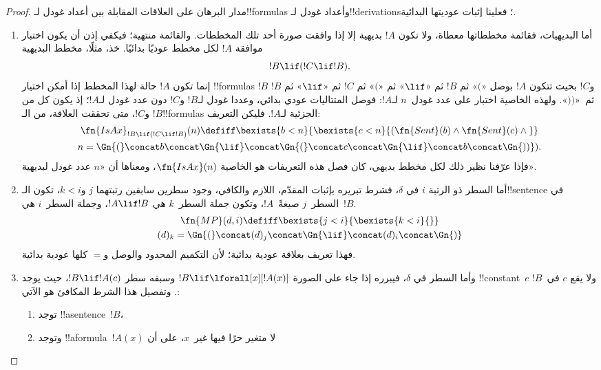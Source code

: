 \documentclass[../../../include/open-logic-section]{subfiles}
\begin{document}
\begin{proof}
مدار البرهان على العلاقات المقابلة بين أعداد غودل لـ!!{formula}s
وأعداد غودل لـ!!{derivation}s؛ فعلينا إثبات عوديتها البدائية.
\begin{enumerate}
\item أما البديهيات، فقائمة مخططاتها معطاة، ولا تكون $!A$ بديهية إلا
  إذا وافقت صورة أحد تلك المخططات. والقائمة منتهية؛ فيكفي إذن أن يكون
  اختبار موافقة $!A$ لكل مخطط عوديًا بدائيًا. خذ، مثلًا، مخطط البديهية
  \[
  !B \lif (!C \lif !B).
  \]
  إنما تكون $!A$ حالة لهذا المخطط إذا أمكن اختيار !!{formula}s $!B$
  و$!C$ بحيث تتكون $!A$ بوصل «$($» ثم $!B$ ثم «$\lif$» ثم «$($»
  ثم $!C$ ثم «$\lif$» ثم $!B$ ثم~«$))$». ولهذه الخاصية اختبار على
  عدد غودل~$n$ لـ$!A$: فوصل المتتاليات عودي بدائي، وعددا غودل
  لـ$!B$ و$!C$ دون عدد غودل لـ$!A$؛ إذ يكون كل من $!B$ و$!C$،
  متى تحققت العلاقة، من الـ!!{formula}s الجزئية لـ$!A$.
  فليكن التعريف:
  \begin{multline*}
  \fn{IsAx}_{!B \lif (!C \lif !B)}(n) \defiff \bexists{b< n}{
    \bexists{c < n}{(\fn{Sent}(b) \land \fn{Sent}(c) \land {}}}\\ n =
  \Gn{(} \concat b \concat \Gn{\lif} \concat \Gn{(} \concat c \concat
  \Gn{\lif} \concat b \concat \Gn{))}).
  \end{multline*}
  فإذا عرّفنا نظير ذلك لكل مخطط بديهي، كان فصل هذه التعريفات هو
  الخاصية $\fn{IsAx}(n)$، ومعناها أن «$n$ عدد غودل لبديهية».
\item أما السطر ذو الرتبة $i$ في $\delta$، فشرط تبريره بإثبات المقدّم، اللازم والكافي،
  وجود سطرين سابقين رتبتهما $j$ و$k<i$، تكون الـ!!{sentence} في السطر~$j$
  صيغةً~$!A$، وتكون جملة السطر~$k$ هي $!A\lif !B$، وجملة
  السطر~$i$ هي~$!B$.
  \begin{multline*}
    \fn{MP}(d, i) \defiff \bexists{j < i}{\bexists{k < i}{}}\\
    (d)_k = \Gn{(} \concat (d)_j
      \concat \Gn{\lif} \concat (d)_i \concat \Gn{)}
  \end{multline*}
  فهذا تعريف بعلاقة عودية بدائية؛ لأن التكميم المحدود والوصل و$=$
  كلها عودية بدائية.
\item وأما السطر في $\delta$، فيبرره \QR{} إذا جاء على الصورة
  $!B\lif\lforall[x][!A(x)]$ وسبقه سطر $!B\lif !A(c)$،
  حيث يوجد !!{constant}~$c$ ولا يقع $c$ في~$!B$. وتفصيل هذا الشرط المكافئ هو الآتي:
  \begin{enumerate}
  \item توجد !!a{sentence}~$!B$،
  \item وتوجد !!a{formula}~$!A(x)$ لا متغير حرًا فيها غير~$x$، على أن

\end{enumerate}
\end{enumerate}
\end{proof}
\end{document}
